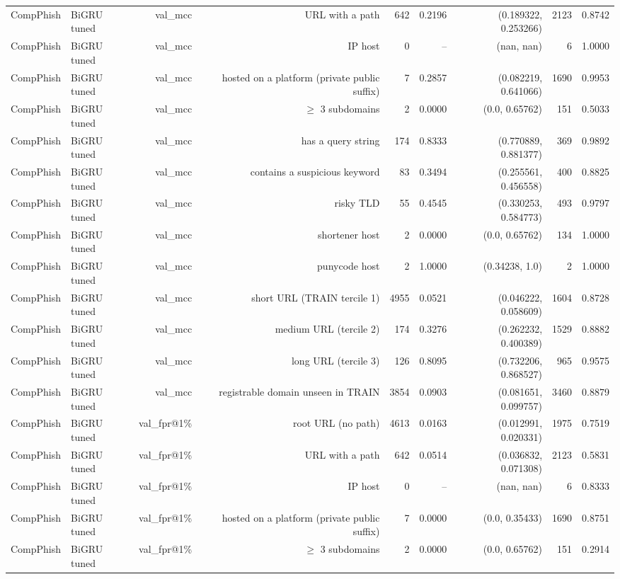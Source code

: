 \begin{table}[t]
\begin{tabular}{llrrrrrrr}
CompPhish & BiGRU tuned & val\_mcc & URL with a path & 642 & 0.2196 & (0.189322, 0.253266) & 2123 & 0.8742 \\
CompPhish & BiGRU tuned & val\_mcc & IP host & 0 & -- & (nan, nan) & 6 & 1.0000 \\
CompPhish & BiGRU tuned & val\_mcc & hosted on a platform (private public suffix) & 7 & 0.2857 & (0.082219, 0.641066) & 1690 & 0.9953 \\
CompPhish & BiGRU tuned & val\_mcc & $\geq$ 3 subdomains & 2 & 0.0000 & (0.0, 0.65762) & 151 & 0.5033 \\
CompPhish & BiGRU tuned & val\_mcc & has a query string & 174 & 0.8333 & (0.770889, 0.881377) & 369 & 0.9892 \\
CompPhish & BiGRU tuned & val\_mcc & contains a suspicious keyword & 83 & 0.3494 & (0.255561, 0.456558) & 400 & 0.8825 \\
CompPhish & BiGRU tuned & val\_mcc & risky TLD & 55 & 0.4545 & (0.330253, 0.584773) & 493 & 0.9797 \\
CompPhish & BiGRU tuned & val\_mcc & shortener host & 2 & 0.0000 & (0.0, 0.65762) & 134 & 1.0000 \\
CompPhish & BiGRU tuned & val\_mcc & punycode host & 2 & 1.0000 & (0.34238, 1.0) & 2 & 1.0000 \\
CompPhish & BiGRU tuned & val\_mcc & short URL (TRAIN tercile 1) & 4955 & 0.0521 & (0.046222, 0.058609) & 1604 & 0.8728 \\
CompPhish & BiGRU tuned & val\_mcc & medium URL (tercile 2) & 174 & 0.3276 & (0.262232, 0.400389) & 1529 & 0.8882 \\
CompPhish & BiGRU tuned & val\_mcc & long URL (tercile 3) & 126 & 0.8095 & (0.732206, 0.868527) & 965 & 0.9575 \\
CompPhish & BiGRU tuned & val\_mcc & registrable domain unseen in TRAIN & 3854 & 0.0903 & (0.081651, 0.099757) & 3460 & 0.8879 \\
CompPhish & BiGRU tuned & val\_fpr@1\% & root URL (no path) & 4613 & 0.0163 & (0.012991, 0.020331) & 1975 & 0.7519 \\
CompPhish & BiGRU tuned & val\_fpr@1\% & URL with a path & 642 & 0.0514 & (0.036832, 0.071308) & 2123 & 0.5831 \\
CompPhish & BiGRU tuned & val\_fpr@1\% & IP host & 0 & -- & (nan, nan) & 6 & 0.8333 \\
CompPhish & BiGRU tuned & val\_fpr@1\% & hosted on a platform (private public suffix) & 7 & 0.0000 & (0.0, 0.35433) & 1690 & 0.8751 \\
CompPhish & BiGRU tuned & val\_fpr@1\% & $\geq$ 3 subdomains & 2 & 0.0000 & (0.0, 0.65762) & 151 & 0.2914 \\

\end{tabular}
\end{table}
